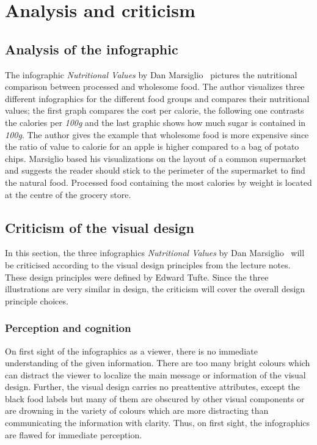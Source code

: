 \section{Analysis and criticism}

\subsection{Analysis of the infographic}

The infographic \textit{Nutritional Values} by Dan
Marsiglio~\cite{DanMarsiglio2008} pictures the nutritional comparison between
processed and wholesome food. The author visualizes three different infographics
for the different food groups and compares their nutritional values; the first
graph compares the cost per calorie, the following one contrasts the calories
per \textit{100g} and the last graphic shows how much sugar is contained in
\textit{100g}. The author gives the example that wholesome food is more
expensive since the ratio of value to calorie for an apple is higher compared to
a bag of potato chips. Marsiglio based his visualizations on the layout of a
common supermarket and suggests the reader should stick to the perimeter of the
supermarket to find the natural food.  Processed food containing the most
calories by weight is located at the centre of the grocery store.

\subsection{Criticism of the visual design}

In this section, the three infographics \textit{Nutritional Values} by Dan
Marsiglio~\cite{DanMarsiglio2008} will be criticised according to the visual
design principles from the lecture notes. These design principles were defined
by Edward Tufte\cite{Tufte2001}. Since the three illustrations are very similar
in design, the criticism will cover the overall design principle choices.

\subsubsection{Perception and cognition}

On first sight of the infographics as a viewer, there is no immediate
understanding of the given information. There are too many bright colours which
can distract the viewer to localize the main message or information of the
visual design. Further, the visual design carries no preattentive attributes,
except the black food labels but many of them are obscured by other visual
components or are drowning in the variety of colours which are more distracting
than communicating the information with clarity. Thus, on first sight, the
infographics are flawed for immediate perception.

